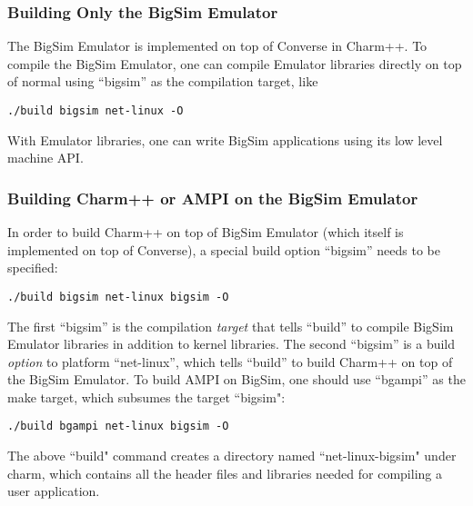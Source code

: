         \subsubsection{Building Only the BigSim Emulator}

The BigSim Emulator is implemented on top of Converse in Charm++.
To compile the BigSim Emulator, one can compile Emulator libraries
directly on top of normal \charmpp{} using ``bigsim'' as the compilation
target, like
\begin{verbatim}
./build bigsim net-linux -O
\end{verbatim}

With Emulator libraries, one can write BigSim applications using its
        low level machine API.

        \subsubsection{Building Charm++ or AMPI on the BigSim Emulator}

In order to build Charm++ on top of BigSim Emulator (which itself is 
implemented on top of Converse), a special build option ``bigsim''
needs to be specified:
\begin{verbatim}
./build bigsim net-linux bigsim -O
\end{verbatim}

The first ``bigsim'' is the compilation {\em target} that tells ``build'' to
compile BigSim Emulator libraries in addition to \charmpp{} kernel libraries.
The second ``bigsim'' is a build {\em option} to platform ``net-linux'', which tells
``build'' to build Charm++ on top of the BigSim Emulator. 
        To build AMPI on BigSim, one should use ``bgampi'' as the make target, which subsumes the target
``bigsim":
\begin{verbatim}
./build bgampi net-linux bigsim -O
\end{verbatim}

        The above ``build" command creates a directory named 
``net-linux-bigsim" under charm, which contains all the header files and
libraries needed for compiling a user application.

